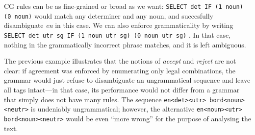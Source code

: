 CG rules can be as fine-grained or broad as we want: 
\texttt{SELECT det IF (1 noun) (0 noun)} would match any determiner and any noun, 
and succesfully disambiguate \emph{en} in this case. 
We can also enforce grammaticality by writing \texttt{SELECT det utr sg IF (1 noun utr sg) (0 noun utr sg)}%
. In that case, nothing in the grammatically incorrect phrase matches, and it is left ambiguous.



The previous example illustrates that the notions of \emph{accept} and \emph{reject} are not clear: if agreement was enforced
by enumerating only legal combinations, the grammar would just refuse to disambiguate
an ungrammatical sequence and leave all tags intact---in that case,
its performance would not differ from a grammar that simply does not have many rules.
The sequence \verb!en<det><utr> bord<noun><neutr>! is undeniably ungrammatical; however, the alternative \verb!en<noun><utr> bord<noun><neutr>! would be even ``more wrong'' for the purpose of analysing the text.


